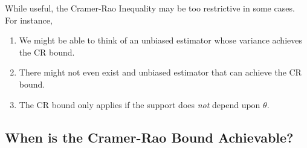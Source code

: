 \documentclass[a4paper,12pt]{scrartcl}
\begin{document}
While useful, the Cramer-Rao Inequality may be too restrictive in some
cases. For instance,
\begin{enumerate}
   \item{We might be able to think of an unbiased estimator
      whose variance achieves the CR bound.
      }
   \item{There might not even exist and unbiased estimator that can
      achieve the CR bound.}
   \item{The CR bound only applies if the support does \emph{not}
      depend upon $\theta$.}
\end{enumerate}

\subsection{When is the Cramer-Rao Bound Achievable?}
\end{document}
